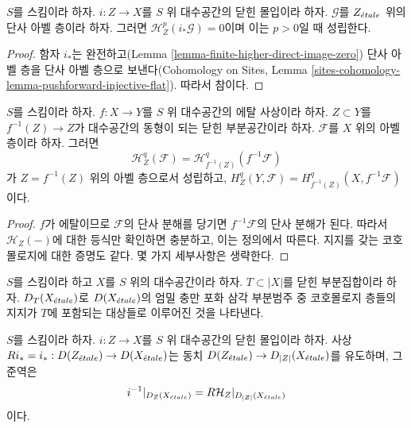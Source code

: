 \begin{lemma}
\label{lemma-cohomology-with-support-sheaf-on-support}
$S$를 스킴이라 하자. $i : Z \to X$를 $S$ 위 대수공간의 닫힌
몰입이라 하자. $\mathcal{G}$를 $Z_{\acute{e}tale}$ 위의 단사 아벨 층이라 하자.
그러면 $\mathcal{H}^p_Z(i_*\mathcal{G}) = 0$이며 이는 $p > 0$일 때
성립한다.
\end{lemma}

\begin{proof}
함자 $i_*$는 완전하고(Lemma
\ref{lemma-finite-higher-direct-image-zero}) 단사 아벨 층을 단사 아벨
층으로 보낸다(Cohomology on Sites, Lemma
\ref{sites-cohomology-lemma-pushforward-injective-flat}). 따라서 참이다.
\end{proof}

\begin{lemma}
\label{lemma-etale-localization-sheaf-with-support}
$S$를 스킴이라 하자. $f : X \to Y$를 $S$ 위 대수공간의 에탈
사상이라 하자. $Z \subset Y$를 $f^{-1}(Z) \to Z$가 대수공간의
동형이 되는 닫힌 부분공간이라 하자.
$\mathcal{F}$를 $X$ 위의 아벨 층이라 하자. 그러면
$$
\mathcal{H}^q_Z(\mathcal{F}) = \mathcal{H}^q_{f^{-1}(Z)}(f^{-1}\mathcal{F})
$$
가 $Z = f^{-1}(Z)$ 위의 아벨 층으로서 성립하고,
$H^q_Z(Y, \mathcal{F}) =
H^q_{f^{-1}(Z)}(X, f^{-1}\mathcal{F})$이다.
\end{lemma}

\begin{proof}
$f$가 에탈이므로 $\mathcal{F}$의 단사 분해를 당기면
$f^{-1}\mathcal{F}$의 단사 분해가 된다. 따라서
$\mathcal{H}_Z(-)$에 대한 등식만 확인하면 충분하고, 이는 정의에서
따른다. 지지를 갖는 코호몰로지에 대한 증명도 같다. 몇 가지 세부사항은
생략한다.
\end{proof}

\noindent
$S$를 스킴이라 하고 $X$를 $S$ 위의 대수공간이라 하자.
$T \subset |X|$를 닫힌 부분집합이라 하자.
$D_T(X_{\acute{e}tale})$로 $D(X_{\acute{e}tale})$의 엄밀 충만 포화 삼각 부분범주 중
코호몰로지 층들의 지지가 $T$에 포함되는 대상들로 이루어진 것을
나타낸다.

\begin{lemma}
\label{lemma-complexes-with-support-on-closed}
$S$를 스킴이라 하자. $i : Z \to X$를 $S$ 위 대수공간의 닫힌
몰입이라 하자. 사상
$Ri_* = i_* : D(Z_{\acute{e}tale}) \to D(X_{\acute{e}tale})$는 동치
$D(Z_{\acute{e}tale}) \to D_{|Z|}(X_{\acute{e}tale})$를 유도하며, 그 준역은
$$
i^{-1}|_{D_Z(X_{\acute{e}tale})} = R\mathcal{H}_Z|_{D_{|Z|}(X_{\acute{e}tale})}
$$
이다.
\end{lemma}

